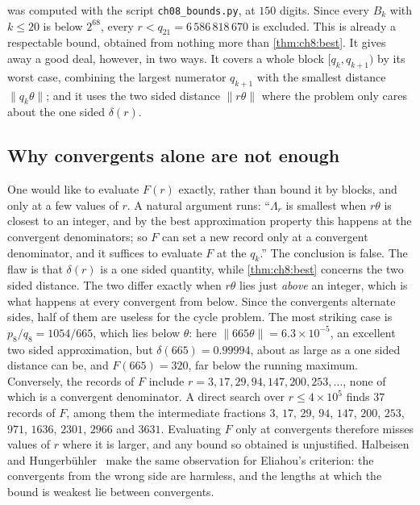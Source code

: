  was computed with the script \texttt{ch08\_bounds.py}, at $150$ digits. Since every
$B_k$ with $k\leq20$ is below $2^{68}$, every $r<q_{21}=6\,586\,818\,670$ is
excluded. This is already a respectable bound, obtained from nothing more than
\cref{thm:ch8:best}. It gives away a good deal, however, in two ways. It
covers a whole block $[q_k,q_{k+1})$ by its worst case, combining the largest
numerator $q_{k+1}$ with the smallest distance $\|q_k\theta\|$; and it uses
the two sided distance $\|r\theta\|$ where the problem only cares about the
one sided $\delta(r)$.

\subsection{Why convergents alone are not enough}

\begin{remark}\label{rem:ch8:false}
One would like to evaluate $F(r)$ exactly, rather than bound it by blocks,
and only at a few values of $r$. A natural argument runs: ``$\Lambda_r$ is
smallest when $r\theta$ is closest to an integer, and by the best
approximation property this happens at the convergent denominators; so $F$
can set a new record only at a convergent denominator, and it suffices to
evaluate $F$ at the $q_k$.'' The conclusion is false. The flaw is that
$\delta(r)$ is a one sided quantity, while \cref{thm:ch8:best} concerns the
two sided distance. The two differ exactly when $r\theta$ lies just
\emph{above} an integer, which is what happens at every convergent from below.
Since the convergents alternate sides, half of them are useless for the cycle
problem. The most striking case is $p_8/q_8=1054/665$, which lies below
$\theta$: here $\|665\theta\|=6.3\times10^{-5}$, an excellent two sided
approximation, but $\delta(665)=0.99994$, about as large as a one sided
distance can be, and $F(665)=320$, far below the running maximum. Conversely,
the records of $F$ include $r=3,17,29,94,147,200,253,\dots$, none of which is a
convergent denominator. A direct search over $r\leq4\times10^5$ finds $37$
records of $F$, among them the intermediate fractions $3$, $17$, $29$, $94$,
$147$, $200$, $253$, $971$, $1636$, $2301$, $2966$ and $3631$. Evaluating $F$
only at convergents therefore misses values of $r$ where it is larger, and any
bound so obtained is unjustified.
Halbeisen and Hungerb\"uhler~\cite[\S4.4]{halbeisen1997} make the same observation for Eliahou's criterion: the convergents from the wrong side are harmless, and the lengths at which the bound is weakest lie between convergents.
\end{remark}

